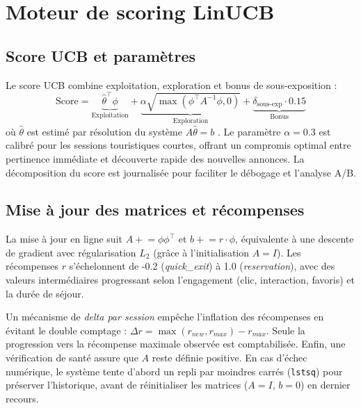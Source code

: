 \section{Moteur de scoring LinUCB}

\subsection{Score UCB et paramètres}

Le score UCB combine exploitation, exploration et bonus de sous-exposition :
\[ \text{Score} = \underbrace{\hat{\theta}^\top \phi}_{\text{Exploitation}} + \underbrace{\alpha \sqrt{\max(\phi^\top A^{-1} \phi, 0)}}_{\text{Exploration}} + \underbrace{\delta_{\text{sous-exp}} \cdot 0.15}_{\text{Bonus}} \]
où $\hat{\theta}$ est estimé par résolution du système $A\hat{\theta} = b$ . 
Le paramètre $\alpha = 0.3$ est calibré pour les sessions touristiques courtes, offrant un compromis 
optimal entre pertinence immédiate et découverte rapide des nouvelles annonces. La décomposition du 
score est journalisée pour faciliter le débogage et l'analyse A/B.


\subsection{Mise à jour des matrices et récompenses}

La mise à jour en ligne suit $A \mathrel{+}= \phi \phi^\top$ et $b \mathrel{+}= r \cdot \phi$, 
équivalente à une descente de gradient avec régularisation $L_2$ (grâce à l'initialisation $A = I$). 
Les récompenses $r$ s'échelonnent de -0.2 (\textit{quick\_exit}) à 1.0 (\textit{reservation}), 
avec des valeurs intermédiaires progressant selon l'engagement (clic, interaction, favoris) et 
la durée de séjour. 

Un mécanisme de \textit{delta par session} empêche l'inflation des récompenses en évitant le 
double comptage : $\Delta r = \max(r_{new}, r_{max}) - r_{max}$. Seule la progression vers 
la récompense maximale observée est comptabilisée. Enfin, une vérification de santé assure que 
 $A$ reste définie positive. En cas d'échec numérique, le système tente d'abord un repli par 
moindres carrés (\texttt{lstsq}) pour préserver l'historique, avant de réinitialiser les 
matrices ($A = I$, $b = 0$) en dernier recours.



